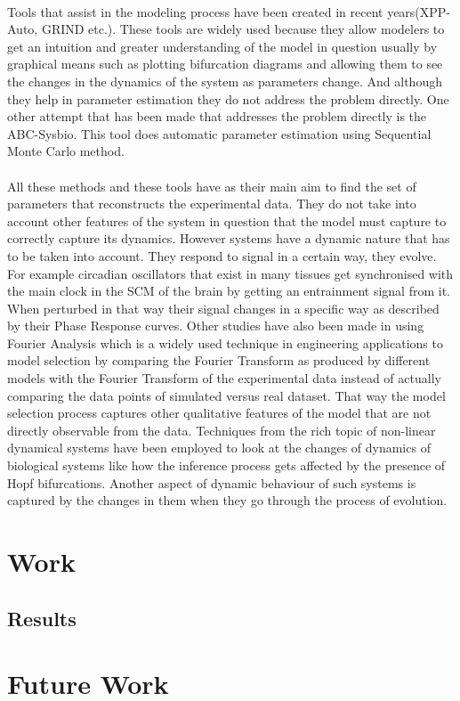 \documentclass[12pt,a4paper,titlepage, fullpage]{article}
\begin{document}
\noindent
\\
Tools that assist in the modeling process have been created in recent years(XPP-Auto, GRIND etc.). These tools are widely used because they allow modelers to get an intuition and greater understanding of the model in question usually by graphical means such as plotting bifurcation diagrams and allowing them to see the changes in the dynamics of the system as parameters change. And although they help in parameter estimation they do not address the problem directly. One other attempt that has been made that addresses the problem directly is the ABC-Sysbio\cite{liebe2010abcpy}. This tool does automatic parameter estimation using Sequential Monte Carlo method.\\
\noindent
\\
All these methods and these tools have as their main aim to find the set of parameters that reconstructs the experimental data. They do not take into account other features of the system in question that the model must capture to correctly capture its dynamics. However systems have a dynamic nature that has to be taken into account. They respond to signal in a certain way, they evolve. For example circadian oscillators that exist in many tissues get synchronised with the main clock in the SCM of the brain by getting an entrainment signal from it. When perturbed in that way their signal changes in a specific way as described by their Phase Response curves\cite{pfeuty2011robust}. Other studies have also been made in using Fourier Analysis which is a widely used technique in engineering applications to model selection by comparing the Fourier Transform as produced by different models with the Fourier Transform of the experimental data instead of actually comparing the data points of simulated versus real dataset\cite{konopka2010gene}. That way the model selection process captures other qualitative features of the model that are not directly observable from the data. Techniques from the rich topic of non-linear dynamical systems have been employed to look at the changes of dynamics of biological systems like how the inference process gets affected by the presence of Hopf bifurcations\cite{kirk2008parameter}. Another aspect of dynamic behaviour of such systems is captured by the changes in them when they go through the process of evolution. 
\section{Work}
\subsection{Results}

\section{Future Work}


\end{document}
